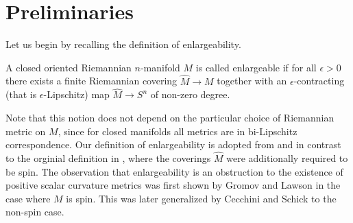 \section{Preliminaries}


Let us begin by recalling the definition of enlargeability.

\begin{definition}
    A closed oriented Riemannian $n$-manifold $M$ is called enlargeable if for all $\epsilon >0$ there exists a finite Riemannian covering $\hat{M} \to M$ together with an $\epsilon$-contracting (that is $\epsilon$-Lipschitz) map $\hat{M} \to S^n$ of non-zero degree.
\end{definition}

Note that this notion does not depend on the particular choice of Riemannian metric on $M$, since for closed manifolds all metrics are in bi-Lipschitz correspondence. Our definition of enlargeability is adopted from \cite{cecchini2021enlargeable} and \cite{HankeSchick} in contrast to the orginial definition in \cite{gromov1980spin}, where the coverings $\hat{M}$ were additionally required to be spin. The observation that enlargeability is an obstruction to the existence of positive scalar curvature metrics was first shown by Gromov and Lawson \cite{gromov1980spin} in the case where $M$ is spin. This was later generalized by Cecchini and Schick \cite{cecchini2021enlargeable} to the non-spin case.

